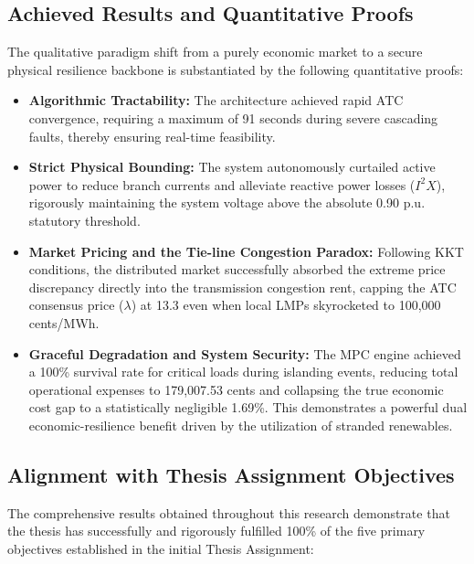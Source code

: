\documentclass{thesis_1side}
\begin{document}
\subsection{Achieved Results and Quantitative Proofs}

The qualitative paradigm shift from a purely economic market to a secure physical resilience backbone is substantiated by the following quantitative proofs:

\begin{itemize}
    \item \textbf{Algorithmic Tractability:} The architecture achieved rapid ATC convergence, requiring a maximum of 91 seconds during severe cascading faults, thereby ensuring real-time feasibility.
    \item \textbf{Strict Physical Bounding:} The system autonomously curtailed active power to reduce branch currents and alleviate reactive power losses ($I^2X$), rigorously maintaining the system voltage above the absolute 0.90 p.u. statutory threshold.
    \item \textbf{Market Pricing and the Tie-line Congestion Paradox:} Following KKT conditions, the distributed market successfully absorbed the extreme price discrepancy directly into the transmission congestion rent, capping the ATC consensus price ($\lambda$) at 13.3 even when local LMPs skyrocketed to 100,000 cents/MWh.
    \item \textbf{Graceful Degradation and System Security:} The MPC engine achieved a 100\% survival rate for critical loads during islanding events, reducing total operational expenses to 179,007.53 cents and collapsing the true economic cost gap to a statistically negligible 1.69\%. This demonstrates a powerful dual economic-resilience benefit driven by the utilization of stranded renewables.
\end{itemize}

\subsection{Alignment with Thesis Assignment Objectives}

The comprehensive results obtained throughout this research demonstrate that the thesis has successfully and rigorously fulfilled 100\% of the five primary objectives established in the initial Thesis Assignment:
\end{document}

